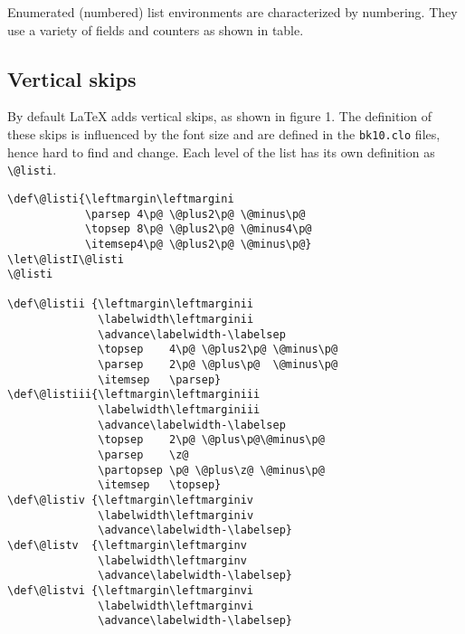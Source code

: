 Enumerated (numbered) list environments are characterized by numbering. They use a variety of fields and counters as shown in table.

\subsection{Vertical skips}

By default LaTeX adds vertical skips, as shown in figure 1. The definition of these skips is influenced by the font size and are defined in the \texttt{bk10.clo} files, hence hard to find and change. Each level of the list has its own definition as \lstinline{\@listi}.

\bigskip
{}

\begin{tcolorbox}[title=Extract from bk10.clo]
\begin{lstlisting}
\def\@listi{\leftmargin\leftmargini
            \parsep 4\p@ \@plus2\p@ \@minus\p@
            \topsep 8\p@ \@plus2\p@ \@minus4\p@
            \itemsep4\p@ \@plus2\p@ \@minus\p@}
\let\@listI\@listi
\@listi

\def\@listii {\leftmargin\leftmarginii
              \labelwidth\leftmarginii
              \advance\labelwidth-\labelsep
              \topsep    4\p@ \@plus2\p@ \@minus\p@
              \parsep    2\p@ \@plus\p@  \@minus\p@
              \itemsep   \parsep}
\def\@listiii{\leftmargin\leftmarginiii
              \labelwidth\leftmarginiii
              \advance\labelwidth-\labelsep
              \topsep    2\p@ \@plus\p@\@minus\p@
              \parsep    \z@
              \partopsep \p@ \@plus\z@ \@minus\p@
              \itemsep   \topsep}
\def\@listiv {\leftmargin\leftmarginiv
              \labelwidth\leftmarginiv
              \advance\labelwidth-\labelsep}
\def\@listv  {\leftmargin\leftmarginv
              \labelwidth\leftmarginv
              \advance\labelwidth-\labelsep}
\def\@listvi {\leftmargin\leftmarginvi
              \labelwidth\leftmarginvi
              \advance\labelwidth-\labelsep}
\end{lstlisting}
\end{tcolorbox}


